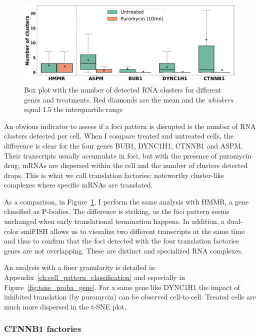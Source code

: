 \begin{figure}[]
    \centering
    \includegraphics[width=\textwidth]{figures/chapter5/plot_puromycin}
    \caption{Box plot with the number of detected RNA clusters for different genes and treatments.
	Red diamonds are the mean and the \textit{whiskers} equal 1.5 the interquartile range}
    \label{fig:plot_puromycin}
\end{figure}

An obvious indicator to assess if a foci pattern is disrupted is the number of \ac{RNA} clusters detected per cell.
When I compare treated and untreated cells, the difference is clear for the four genes BUB1, DYNC1H1, CTNNB1 and ASPM.
Their transcripts usually accumulate in foci, but with the presence of puromycin drug, \ac{mRNA}s are dispersed within the cell and the number of clusters detected drops.
This is what we call translation factories: noteworthy cluster-like complexes where specific \ac{mRNA}s are translated.

As a comparison, in Figure~\ref{fig:plot_puromycin}, I perform the same analysis with HMMR, a gene classified as \ac{P-bodies}.
The difference is striking, as the foci pattern seems unchanged when early translational termination happens.
In addition, a dual-color \ac{smiFISH} allows us to visualize two different transcripts at the same time and thus to confirm that the foci detected with the four translation factories genes are not overlapping.
These are distinct and specialized \ac{RNA} complexes.

An analysis with a finer granularity is detailed in Appendix~\ref{ch:cell_pattern_classification} and especially in Figure~\ref{fig:tsne_proba_gene}.
For a same gene like DYNC1H1 the impact of inhibited translation (by puromycin) can be observed cell-to-cell.
Treated cells are much more dispersed in the \ac{t-SNE} plot.

\subsubsection{CTNNB1 factories}

